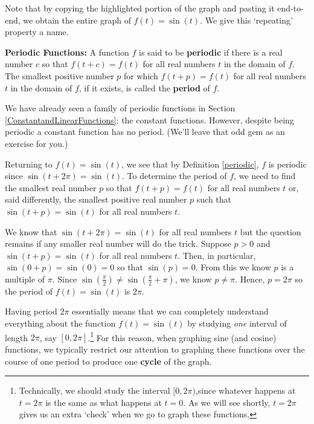 \documentclass{ximera}
\begin{document}

\begin{center}
\end{center}

Note that by copying  the highlighted portion of the graph and pasting it end-to-end, we obtain the entire graph of $f(t) = \sin(t)$.  We give this `repeating' property a name.

\begin{definition} \label{periodic} \textbf{Periodic Functions:} A function $f$ is said to be \textbf{periodic}  if there is a real number $c$ so that $f(t+c) = f(t)$ for all real numbers $t$ in the domain of $f$.  The smallest positive number $p$ for which $f(t+p) = f(t)$ for all real numbers $t$ in the domain of $f$, if it exists, is called the \textbf{period} of $f$. 

\end{definition}



We have already seen a family of periodic functions in Section \ref{ConstantandLinearFunctions}:  the constant functions.  However, despite being periodic a constant function has no period.  (We'll leave that odd gem as an exercise for you.)  



Returning to $f(t) = \sin(t)$, we see that by Definition \ref{periodic}, $f$ is periodic since $\sin(t + 2\pi) = \sin(t)$.  To determine the period of $f$, we need to find the smallest real number $p$ so that $f(t+p) = f(t)$ for all real numbers $t$ or, said differently, the smallest positive real number $p$ such that $\sin(t+p) = \sin(t)$  for all real numbers $t$.  



We know that $\sin(t + 2\pi) = \sin(t)$ for all real numbers $t$ but the question remains if any smaller real number will do the trick.  Suppose $p>0$ and $\sin(t + p) = \sin(t)$ for all real numbers $t$.  Then, in particular, $\sin(0+p) = \sin(0)=0$ so that $\sin(p) = 0$.  From this we know $p$ is a multiple of $\pi$.  Since $\sin\left(\frac{\pi}{2} \right)  \neq \sin\left(\frac{\pi}{2} + \pi \right) $, we know $p \neq \pi$.  Hence, $p  = 2\pi$ so the period of $f(t) = \sin(t)$ is $2\pi$. 



Having period $2\pi$ essentially means that we can completely understand everything about the function  $f(t) =  \sin(t)$ by studying \textit{one} interval of length $2\pi$, say $[0,2\pi]$.\footnote{Technically, we should study the interval $[0,2\pi)$,\footnotemark since whatever happens at $t=2\pi$ is the same as what happens at $t=0$.  As we will see shortly, $t=2\pi$ gives us an extra `check' when we go to graph these functions.} \footnotetext{In some advanced texts, the interval of choice is $[-\pi, \pi)$.}  For this reason, when graphing sine (and cosine) functions, we typically restrict our attention to graphing these functions over the course of one period to produce one \textbf{cycle} of the graph. 
 
\end{document}

